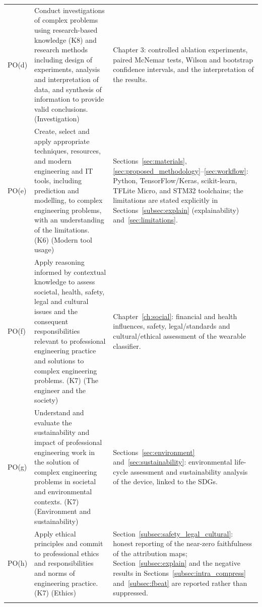 \begin{longtable}{@{}>{\raggedright\arraybackslash}p{0.55in}>{\raggedright\arraybackslash}p{3.1in}>{\raggedright\arraybackslash}p{1.5in}@{}}
PO(d) & Conduct investigations of complex problems using research-based
knowledge (K8) and research methods including design of experiments,
analysis and interpretation of data, and synthesis of information to provide
valid conclusions. (Investigation)
& Chapter 3: controlled ablation experiments, paired McNemar tests,
Wilson and bootstrap confidence intervals, and the interpretation of the
results. \\
\addlinespace

PO(e) & Create, select and apply appropriate techniques, resources, and
modern engineering and IT tools, including prediction and modelling, to
complex engineering problems, with an understanding of the limitations. (K6)
(Modern tool usage)
& Sections~\ref{sec:materials},
\ref{sec:proposed_methodology}--\ref{sec:workflow}: Python,
TensorFlow/Keras, scikit-learn, TFLite
Micro, and STM32 toolchains; the limitations are stated explicitly in
Sections~\ref{subsec:explain} (explainability) and~\ref{sec:limitations}. \\
\addlinespace

PO(f) & Apply reasoning informed by contextual knowledge to assess societal,
health, safety, legal and cultural issues and the consequent
responsibilities relevant to professional engineering practice and solutions
to complex engineering problems. (K7) (The engineer and the society)
& Chapter~\ref{ch:social}: financial and health influences, safety,
legal/standards and
cultural/ethical assessment of the wearable classifier. \\
\addlinespace

PO(g) & Understand and evaluate the sustainability and impact of
professional engineering work in the solution of complex engineering
problems in societal and environmental contexts. (K7)
(Environment and sustainability)
& Sections~\ref{sec:environment} and~\ref{sec:sustainability}:
environmental life-cycle assessment and
sustainability analysis of the device, linked to the SDGs. \\
\addlinespace

PO(h) & Apply ethical principles and commit to professional ethics and
responsibilities and norms of engineering practice. (K7) (Ethics)
& Section~\ref{subsec:safety_legal_cultural}: honest reporting of the
near-zero faithfulness of the
attribution maps; Section~\ref{subsec:explain} and the negative results in
Sections~\ref{subsec:intra_compress} and~\ref{subsec:fbeat} are reported
rather than suppressed. \\
\addlinespace


\end{longtable}
